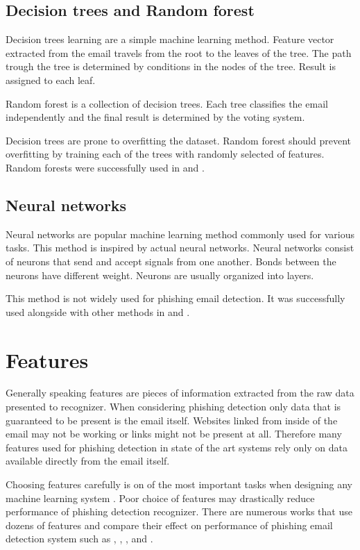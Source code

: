 \documentclass[thesis=B,english]{FITthesis}[2012/10/20]
\begin{document}
\subsection{Decision trees and Random forest}
Decision trees learning are a simple machine learning method. Feature vector extracted from the email travels from the root to the leaves of the tree. The path trough the tree is determined by conditions in the nodes of the tree. Result is assigned to each leaf.

\par Random forest is a collection of decision trees. Each tree classifies the email independently and the final result is determined by the voting system. 
\par Decision trees are prone to overfitting the dataset. Random forest should prevent overfitting by training each of the trees with randomly selected of features. Random forests were successfully used in \cite{fette2007learning} and \cite{vitListik2015detekce}.
    
\subsection{Neural networks}
Neural networks are popular machine learning method commonly used for various tasks. This method is inspired by actual neural networks. Neural networks consist of neurons that send and accept signals from one another. Bonds between the neurons have different weight. Neurons are usually organized into layers.
\par This method is not widely used for phishing email detection. It was successfully used alongside with other methods in \cite{abu2007comparison} and \cite{featuresBasnet2008detection}.

\section{Features}
Generally speaking features are pieces of information extracted from the raw data presented to recognizer. When considering phishing detection only data that is guaranteed to be present is the email itself. Websites linked from inside of the email may not be working or links might not be present at all. Therefore many features used for phishing detection in state of the art systems rely only on data available directly from the email itself. 

\par Choosing features carefully is on of the most important tasks when designing any machine learning system \cite{ultimateFeatureBreakdown}. Poor choice of features may drastically reduce performance of phishing detection recognizer. There are numerous works that use dozens of features and compare their effect on performance of phishing email detection system such as \cite{ultimateFeatureBreakdown}, \cite{featuresBasnet2008detection}, \cite{fette2007learning}, \cite{featuresMa2009detecting} and \cite{featuresUrl}.
\end{document}
